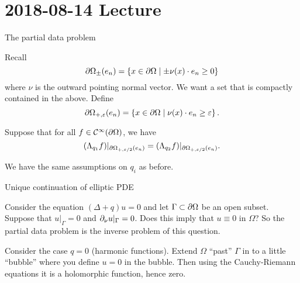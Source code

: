 \section{2018-08-14 Lecture}

The partial data problem

Recall
\[ \partial\Omega_\pm(e_n) = \left\{ x \in \partial\Omega \mid \pm \nu(x) \cdot e_n \geq 0 \right\} \]
where $\nu$ is the outward pointing normal vector.
We want a set that is compactly contained in the above.
Define
\[ \partial\Omega_{+,\varepsilon}(e_n) = \left\{ x \in \partial\Omega \mid \nu(x) \cdot e_n \geq \varepsilon \right\}. \]

\begin{thm}\label{5:partial}
  Suppose that for all $f \in \mathcal{C}^\infty(\partial\Omega)$, we have
  \[ (\Lambda_{q_1}f)|_{\partial\Omega_{+,\varepsilon/2}(e_n)} = (\Lambda_{q_2}f)|_{\partial\Omega_{+,\varepsilon/2}(e_n)}. \]
\end{thm}
We have the same assumptions on $q_i$ as before.

Unique continuation of elliptic PDE

Consider the equation $(\Delta+q)u=0$ and let $\Gamma \subset \partial\Omega$ be an open subset.
Suppose that $u|_{\Gamma}=0$ and $\partial_\nu u|_\Gamma=0$.
Does this imply that $u \equiv 0$ in $\Omega$?
So the partial data problem is the inverse problem of this question.

Consider the case $q=0$ (harmonic functions).
Extend $\Omega$ ``past'' $\Gamma$ in to a little ``bubble'' where you define $u=0$ in the bubble.
Then using the Cauchy-Riemann equations it is a holomorphic function, hence zero.

